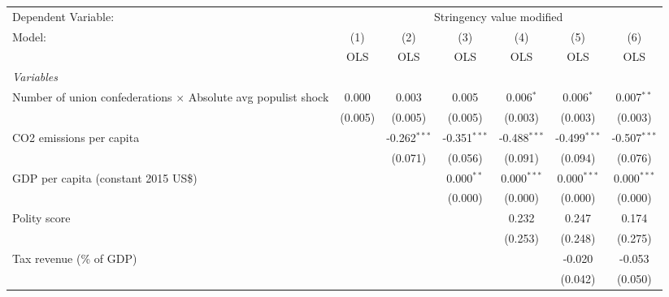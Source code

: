 
\begingroup
\centering
\begin{tabular}{lcccccc}
   \toprule
   Dependent Variable: & \multicolumn{6}{c}{Stringency value modified}\\
   Model:                                                               & (1)     & (2)            & (3)            & (4)            & (5)            & (6)\\  
                                                                        &  OLS    & OLS            & OLS            & OLS            & OLS            & OLS\\  
   \midrule
   \emph{Variables}\\
   Number of union confederations $\times$ Absolute avg populist shock  & 0.000   & 0.003          & 0.005          & 0.006$^{*}$    & 0.006$^{*}$    & 0.007$^{**}$\\   
                                                                        & (0.005) & (0.005)        & (0.005)        & (0.003)        & (0.003)        & (0.003)\\   
   CO2 emissions per capita                                             &         & -0.262$^{***}$ & -0.351$^{***}$ & -0.488$^{***}$ & -0.499$^{***}$ & -0.507$^{***}$\\   
                                                                        &         & (0.071)        & (0.056)        & (0.091)        & (0.094)        & (0.076)\\   
   GDP per capita (constant 2015 US\$)                                  &         &                & 0.000$^{**}$   & 0.000$^{***}$  & 0.000$^{***}$  & 0.000$^{***}$\\   
                                                                        &         &                & (0.000)        & (0.000)        & (0.000)        & (0.000)\\   
   Polity score                                                         &         &                &                & 0.232          & 0.247          & 0.174\\   
                                                                        &         &                &                & (0.253)        & (0.248)        & (0.275)\\   
   Tax revenue (\% of GDP)                                              &         &                &                &                & -0.020         & -0.053\\   
                                                                        &         &                &                &                & (0.042)        & (0.050)\\   

\end{tabular}
